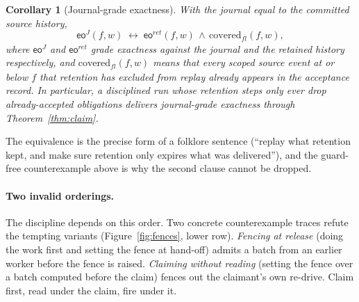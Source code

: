 \documentclass[sigplan,10pt]{acmart}
\theoremstyle{plain}
\newtheorem{corollary}{Corollary}[section]
\theoremstyle{definition}
\newcommand{\eo}{\mathsf{eo}}              %
\begin{document}
\begin{corollary}[Journal-grade exactness]\label{cor:journal}
With the journal equal to the committed source history,
\[
  \eo^{J}(f,w) \;\longleftrightarrow\;
  \eo^{\mathit{ret}}(f,w) \,\wedge\, \mathrm{covered}_{\mathit{fl}}(f,w),
\]
where $\eo^{J}$ and $\eo^{\mathit{ret}}$ grade exactness against the
journal and the retained history respectively, and
$\mathrm{covered}_{\mathit{fl}}(f,w)$ means that every scoped source
event at or below $f$ that retention has excluded from replay already
appears in the acceptance record. In
particular, a disciplined run whose retention steps only ever drop
already-accepted obligations delivers journal-grade exactness through
Theorem~\ref{thm:claim}.
\end{corollary}

The equivalence is the precise form of a folklore sentence (``replay
what retention kept, and make sure retention only expires what was
delivered''), and the guard-free counterexample above is why the second
clause cannot be dropped.

\paragraph{Two invalid orderings.}
The discipline depends on this order. Two concrete counterexample
traces refute the tempting variants
(Figure~\ref{fig:fences}, lower row). \emph{Fencing at release}
(doing the work first and setting the fence at hand-off) admits a batch from an
earlier worker before the fence is raised. \emph{Claiming without
reading} (setting the fence over a batch computed before the
claim) fences out the claimant's own re-drive. Claim first, read under
the claim, fire under it.
\end{document}
